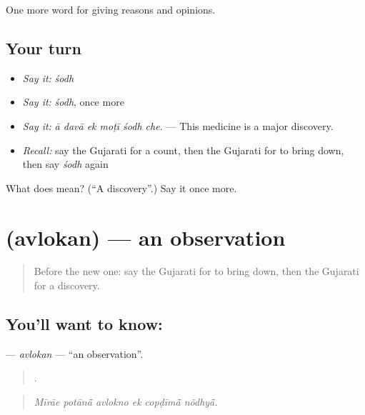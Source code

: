 \begin{grammarlens}[title={What you've built}]
One more word for giving reasons and opinions.
\end{grammarlens}

\subsection*{Your turn}
\begin{itemize}
\raggedright
  \item \emph{Say it:} \emph{śodh}
  \item \emph{Say it:} \emph{śodh}, once more
  \item \emph{Say it:} \emph{ā davā ek moṭī śodh che.} — This medicine is a major discovery.
  \item \emph{Recall:} say the Gujarati for a count, then the Gujarati for to bring down, then say \emph{śodh} again
\end{itemize}

\begin{tcolorbox}[breakable,colback=teal!4,colframe=teal!35!black,title={Before you move on}]
What does  mean? (\textquotedblleft{}A discovery\textquotedblright{}.) Say it once more.
\end{tcolorbox}
\section[\texorpdfstring{\gu{અવલોકન} (avlokan)}{અવલોકન (avlokan)}]{ (avlokan) — an observation}

\label{lesson:GU-C364-avlokan}



\begin{quote}
Before the new one: say the Gujarati for to bring down, then the Gujarati for a discovery.
\end{quote}

\subsection*{You'll want to know: }
\textbf{} — \emph{avlokan} — \textquotedblleft{}an observation\textquotedblright{}.

\begin{quote}
     .
\end{quote}

\begin{quote}
\emph{Mīrāe potānā̃ avlokno ek copḍīmā̃ nõdhyā̃.}
\end{quote}

